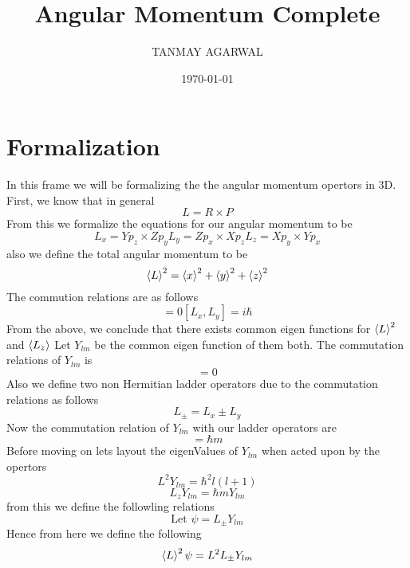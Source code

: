 \documentclass{article}
\begin{document}
\title{Angular Momentum Complete}
\author{TANMAY AGARWAL}
\date{\today}
\maketitle
\tableofcontents
\section{Formalization}
In this frame we will be formalizing the the angular momentum opertors in 3D.
First, we know that in general 
\begin{equation*}
L=R\times{P}
\end{equation*}
From this we formalize the equations for our angular momentum to be 
\begin{equation}
L_x=Yp_z \times Zp_y
L_y=Zp_x\times Xp_z
L_z=Xp_y\times  Yp_x
\end{equation}
also we define the total angular momentum to be 
\begin{equation}
\braket{L}^2=\braket{x}^2+\braket{y}^2+\braket{z}^2
\end{equation}
The commution relations are as follows 
\begin{equation}
[L^2,L_z]=0 
[L_x,L_y]=i\hbar
\end{equation}
From the above, we conclude that there exists common eigen functions for $\braket{L}^2$ and $\braket{L_z}$
Let $Y_{lm}$ be the common eigen function of them both. The commutation relations of $Y_{lm}$ is 
\begin{equation}
[Y_{lm},\braket{L}^2]=0 
\end{equation}
Also we define two non Hermitian ladder operators due to the commutation relations as follows
\begin{equation}
L_{\pm}=L_x \pm L_y 
\end{equation}
Now the commutation relation of $Y_{lm}$ with our ladder operators are
\begin{equation}
[Y_{lm},L_{\pm}]=\hbar m
\end{equation}
Before moving on lets layout the eigenValues of $Y_{lm}$ when acted upon by the opertors 
\begin{equation}
L^2Y_{lm}=\hbar^2l(l+1)
\end{equation}
\begin{equation}
L_zY_{lm}=\hbar mY_{lm}
\end{equation}
from this we define the followling relations 
\begin{equation}
\text{Let $\psi = L_{\pm}Y_{lm}$}
\end{equation}
Hence from here we define the following
\begin{equation}
\braket{L}^2 \psi = L^2  L_{\pm} Y_{lm}
\end{equation}
\end{document}
